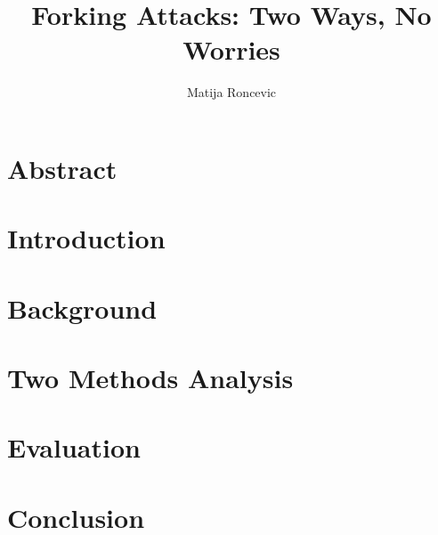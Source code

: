 \documentclass[sigconf]{acmart}
\title{Forking Attacks: Two Ways, No Worries}
\author{Matija Roncevic}
\affiliation{
    \institution{Friedricht-Alexander-Universität Erlangen-Nürnberg}
    \country{}
    \city{}}
\begin{document}
\maketitle  %




\section{Abstract}


\section{Introduction}


\section{Background}


\section{Two Methods Analysis}


\section{Evaluation}


\section{Conclusion}



\end{document}
